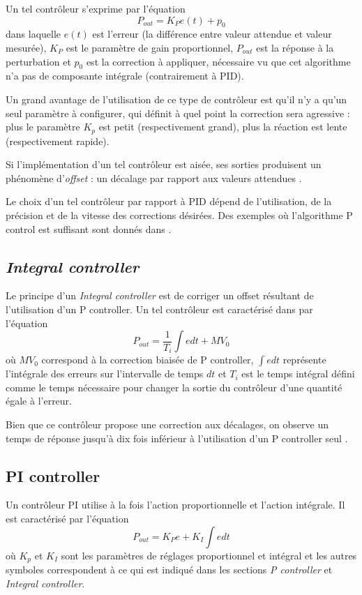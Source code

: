 \documentclass[a4paper,10pt]{report}
\begin{document}
Un tel contrôleur s'exprime par l'équation
\begin{equation}P_{out} = K_{P}e(t) + p_0\end{equation}
dans laquelle $e(t)$ est l'erreur (la différence entre valeur attendue et valeur mesurée), $K_{P}$ est le paramètre de gain proportionnel, $P_{out}$ est la réponse à la perturbation et $p_0$ est la correction à appliquer, nécessaire vu que cet algorithme n'a pas de composante intégrale (contrairement à PID).

Un grand avantage de l'utilisation de ce type de contrôleur est qu'il n'y a qu'un seul paramètre à configurer, qui définit à quel point la correction sera agressive : plus le paramètre $K_{p}$ est petit (respectivement grand), plus la réaction est lente (respectivement rapide).

Si l'implémentation d'un tel contrôleur est aisée, ses sorties produisent un phénomène d'\emph{offset} : un décalage par rapport aux valeurs attendues \cite{svrcek2014real}.

Le choix d'un tel contrôleur par rapport à PID dépend de l'utilisation, de la précision et de la vitesse des corrections désirées.
Des exemples où l'algorithme P control est suffisant sont donnés dans \cite{sellers2001overview}.

\subsection{\emph{Integral controller}}
Le principe d'un \emph{Integral controller} est de corriger un offset résultant de l'utilisation d'un P controller.
Un tel contrôleur est caractérisé dans \cite{svrcek2014real} par l'équation
\begin{equation}P_{out} = \frac{1}{T_{i}}\int e dt + MV_{0}\end{equation}
où $MV_{0}$ correspond à la correction biaisée de P controller,
$\int e dt$ représente l'intégrale des erreurs sur l'intervalle de temps $dt$ et $T_{i}$ est le temps intégral défini comme le temps nécessaire pour changer la sortie du contrôleur d'une quantité égale à l'erreur.

Bien que ce contrôleur propose une correction aux décalages, on observe un temps de réponse jusqu'à dix fois inférieur à l'utilisation d'un P controller seul \cite{svrcek2014real}.

\subsection{PI controller}
Un contrôleur PI utilise à la fois l'action proportionnelle et l'action intégrale.
Il est caractérisé par l'équation
\begin{equation}P_{out} = K_{P} e + K_{I} \int e dt\end{equation}
où $K_{p}$ et $K_{I}$ sont les paramètres de réglages proportionnel et intégral
et les autres symboles correspondent à ce qui est indiqué dans les sections \emph{P controller} et \emph{Integral controller}.
\end{document}
